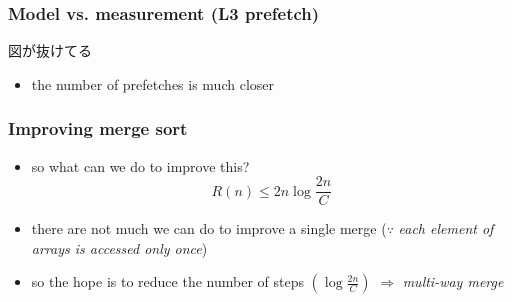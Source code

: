 \documentclass[12pt,dvipdfmx]{beamer}
\newcommand{\ao}[1]{{\color{blue}#1}}
\begin{document}
\begin{frame}
\frametitle{Model vs. measurement (L3 prefetch)}
\begin{center}
\def\svgwidth{0.8\textwidth}  
図が抜けてる
\end{center}

\begin{itemize}
\item the number of prefetches is much closer
\end{itemize}
\end{frame}

\fi

\begin{frame}
\frametitle{Improving merge sort}
\begin{itemize}
\item<1-> so what can we do to improve this?
\[ R(n) \leq 2n \log\frac{2n}{C}  \]

\item<2-> there are not much we can do to improve
  a single merge ($\because$ {\em each element of
  arrays is accessed only once})

\item<3-> so the hope is to reduce the number of steps 
  $\left(\log\frac{2n}{C}\right)$ \ao{$\Rightarrow$ {\em multi-way merge}}
\end{itemize}
\end{frame}
\end{document}
